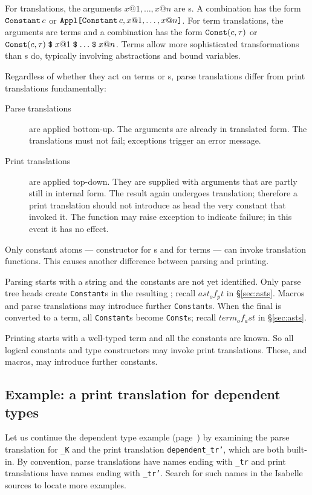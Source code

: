 For \AST{} translations, the arguments $x@1, \ldots, x@n$ are \AST{}s.  A
combination has the form $\mathop{\mbox{\tt Constant}}\nolimits c$ or $\mathop{\mbox{\tt Appl}}\nolimits\mathopen{\mbox{\tt [}}\mathop{\mbox{\tt Constant}}\nolimits c, x@1, \ldots,
  x@n\mathclose{\mbox{\tt ]}}$.  For term translations, the arguments are terms and a combination
has the form $\mathop{\mbox{\tt Const}}\nolimits (c, \tau)$ or $\mathop{\mbox{\tt Const}}\nolimits (c, \tau) \mathrel{\hbox{\tt\$}}
x@1 \mathrel{\hbox{\tt\$}} \ldots \mathrel{\hbox{\tt\$}} x@n$.  Terms allow more sophisticated
transformations than \AST{}s do, typically involving abstractions and bound
variables.

Regardless of whether they act on terms or \AST{}s,
parse translations differ from print translations fundamentally:
\begin{description}
\item[Parse translations] are applied bottom-up.  The arguments are already
  in translated form.  The translations must not fail; exceptions trigger
  an error message.

\item[Print translations] are applied top-down.  They are supplied with
  arguments that are partly still in internal form.  The result again
  undergoes translation; therefore a print translation should not introduce
  as head the very constant that invoked it.  The function may raise
  exception  to indicate failure; in this event it has no
  effect.
\end{description}

Only constant atoms --- constructor  for \AST{}s and
 for terms --- can invoke translation functions.  This
causes another difference between parsing and printing.

Parsing starts with a string and the constants are not yet identified.
Only parse tree heads create {\tt Constant}s in the resulting \AST; recall
$ast_of_pt$ in \S\ref{sec:asts}.  Macros and parse \AST{} translations may
introduce further {\tt Constant}s.  When the final \AST{} is converted to a
term, all {\tt Constant}s become {\tt Const}s; recall $term_of_ast$ in
\S\ref{sec:asts}.

Printing starts with a well-typed term and all the constants are known.  So
all logical constants and type constructors may invoke print translations.
These, and macros, may introduce further constants.


\subsection{Example: a print translation for dependent types}
Let us continue the dependent type example (page~\pageref{prod_trans}) by
examining the parse translation for {\tt _K} and the print translation
{\tt dependent_tr'}, which are both built-in.  By convention, parse
translations have names ending with {\tt _tr} and print translations have
names ending with {\tt _tr'}.  Search for such names in the Isabelle
sources to locate more examples.

